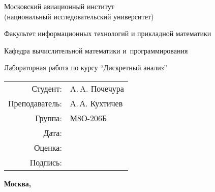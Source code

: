 \begin{titlepage}
\begin{center}
\bfseries

{\Large Московский авиационный институт\\ (национальный исследовательский университет)

}

\vspace{48pt}

{\large Факультет информационных технологий и прикладной математики
}

\vspace{36pt}

{\large Кафедра вычислительной математики и~программирования

}


\vspace{48pt}

Лабораторная работа  по курсу \enquote{Дискретный анализ}

\end{center}

\vspace{72pt}

\begin{flushright}
\begin{tabular}{rl}
Студент: & A.\,A. Почечура \\
Преподаватель: & А.\,А. Кухтичев \\
Группа: & М8О-206Б \\
Дата: & \\
Оценка: & \\
Подпись: & \\
\end{tabular}
\end{flushright}

\vfill

\begin{center}
\bfseries
Москва, \the\year
\end{center}
\end{titlepage}

\pagebreak
